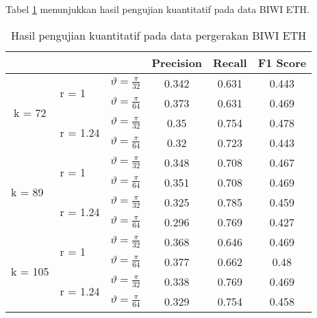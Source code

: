 Tabel \ref{bab6:seq-eth-numbers} menunjukkan hasil pengujian kuantitatif pada data BIWI ETH.

\begin{table}[h]
\centering
\begin{tabular}{|l|l|l|c|c|c|}
\hline
\multicolumn{3}{|l|}{}                                                                                   & Precision & Recall & F1 Score \\ \hline \hline
\multicolumn{1}{|c|}{\multirow{4}{*}{k = 72}} & \multirow{2}{*}{r = 1}    & $\vartheta = \frac{\pi}{32}$ & 0.342     & 0.631  & 0.443    \\ \cline{3-6} 
\multicolumn{1}{|c|}{}                        &                           & $\vartheta = \frac{\pi}{64}$ & 0.373     & 0.631  & 0.469    \\ \cline{2-6} 
\multicolumn{1}{|c|}{}                        & \multirow{2}{*}{r = 1.24} & $\vartheta = \frac{\pi}{32}$ & 0.35      & 0.754  & 0.478    \\ \cline{3-6} 
\multicolumn{1}{|c|}{}                        &                           & $\vartheta = \frac{\pi}{64}$ & 0.32      & 0.723  & 0.443    \\ \hline
\multirow{4}{*}{k = 89}                       & \multirow{2}{*}{r = 1}    & $\vartheta = \frac{\pi}{32}$ & 0.348     & 0.708  & 0.467    \\ \cline{3-6} 
                                              &                           & $\vartheta = \frac{\pi}{64}$ & 0.351     & 0.708  & 0.469    \\ \cline{2-6} 
                                              & \multirow{2}{*}{r = 1.24} & $\vartheta = \frac{\pi}{32}$ & 0.325     & 0.785  & 0.459    \\ \cline{3-6} 
                                              &                           & $\vartheta = \frac{\pi}{64}$ & 0.296     & 0.769  & 0.427    \\ \hline
\multirow{4}{*}{k = 105}                      & \multirow{2}{*}{r = 1}    & $\vartheta = \frac{\pi}{32}$ & 0.368     & 0.646  & 0.469    \\ \cline{3-6} 
                                              &                           & $\vartheta = \frac{\pi}{64}$ & 0.377     & 0.662  & 0.48     \\ \cline{2-6} 
                                              & \multirow{2}{*}{r = 1.24} & $\vartheta = \frac{\pi}{32}$ & 0.338     & 0.769  & 0.469    \\ \cline{3-6} 
                                              &                           & $\vartheta = \frac{\pi}{64}$ & 0.329     & 0.754  & 0.458    \\ \hline
\end{tabular}
\caption{Hasil pengujian kuantitatif pada data pergerakan BIWI ETH}
\label{bab6:seq-eth-numbers}
\end{table}

